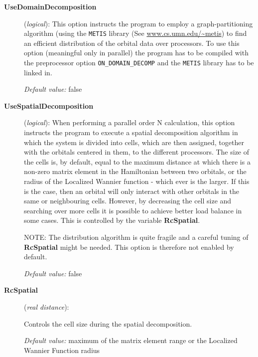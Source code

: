 \begin{description}

\item[\textbf{UseDomainDecomposition}] (\textit{logical}):
   This
  option instructs the program to employ a graph-partitioning
  algorithm (using the \texttt{METIS} library (See \url{www.cs.umn.edu/~metis}) 
  to find an efficient distribution of the
  orbital data over processors.  To use this option (meaningful only
  in parallel) the program has to be compiled with the preprocessor
  option \texttt{ON\_DOMAIN\_DECOMP} and the \texttt{METIS} library has to
  be linked in.

\textit{Default value:}  false

\item[\textbf{UseSpatialDecomposition}] (\textit{logical}):
   When
  performing a parallel order N calculation, this option instructs the
  program to execute a spatial decomposition algorithm in which the
  system is divided into cells, which are then assigned, together with
  the orbitals centered in them, to the different processors. The size
  of the cells is, by default, equal to the maximum distance at which
  there is a non-zero matrix element in the Hamiltonian between two
  orbitals, or the radius of the Localized Wannier function - which
  ever is the larger. If this is the case, then an orbital will only
  interact with other orbitals in the same or neighbouring
  cells. However, by decreasing the cell size and searching over more
  cells it is possible to achieve better load balance in some
  cases. This is controlled by the variable \textbf{RcSpatial}.

NOTE: The distribution algorithm is quite fragile and a careful tuning
of \textbf{RcSpatial} might be needed. This option is therefore not
enabled by default.

\textit{Default value:}  false

\item[\textbf{RcSpatial}] (\textit{real distance}):

Controls the cell size during the spatial decomposition.

\textit{Default value:}  maximum of the matrix element range or the
Localized Wannier Function radius

\end{description}


